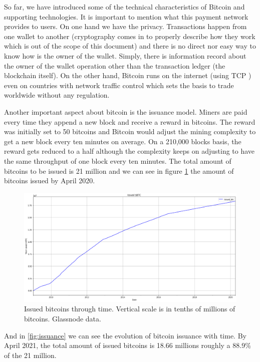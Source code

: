 So far, we have introduced some of the technical characteristics of Bitcoin and supporting technologies. It is important to mention what this payment network provides to users. On one hand we have the privacy. Transactions happen from one wallet \cite{wallet} to another (cryptography comes in to properly describe how they work which is out of the scope of this document) and there is no direct nor easy way to know how is the owner of the wallet. Simply, there is information record about the owner of the wallet operation other than the transaction ledger (the blockchain itself). On the other hand, Bitcoin runs on the internet (using TCP \cite{bitcoin_network}) even on countries with network traffic control which sets the basis to trade worldwide without any regulation.

Another important aspect about bitcoin is the issuance model. Miners are paid every time they append a new block and receive a reward in bitcoins. The reward was initially set to 50 bitcoins and Bitcoin would adjust the mining complexity to get a new block every ten minutes on average. On a 210,000 blocks basis, the reward gets reduced to a half although the complexity keeps on adjusting to have the same throughput of one block every ten minutes. The total amount of bitcoins to be issued is 21 million and we can see in figure \ref{fig:issued_bitcoins} the amount of bitcoins issued by April 2020.

\begin{figure}[!htb]
    \centering
    \includegraphics[width=\textwidth]{introduction/images/issued_btc.png}
    \caption{Issued bitcoins through time. Vertical scale is in tenths of millions of bitcoins. Glassnode data.}
    \label{fig:issued_bitcoins}
\end{figure}

And in \ref{fig:issuance} we can see the evolution of bitcoin issuance with time. By April 2021, the total amount of issued bitcoins is 18.66 millions roughly a 88.9\% of the 21 million.

